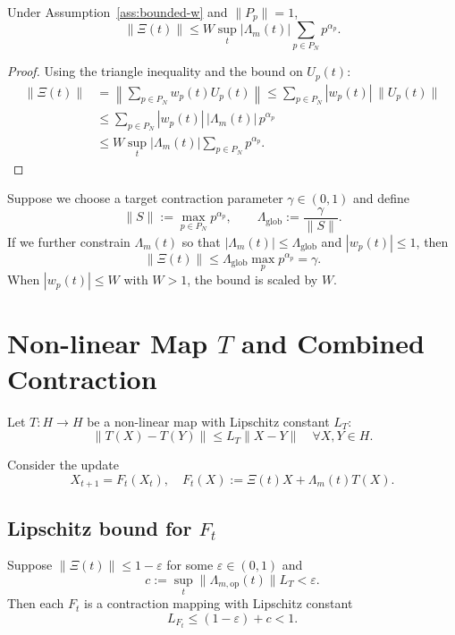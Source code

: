 \documentclass[11pt]{article}
\begin{document}
\begin{lemma}\label{lem:Xi-norm}
Under Assumption~\ref{ass:bounded-w} and $\|P_p\|=1$,
\[
\|\Xi(t)\| \le W \sup_t|\Lambda_m(t)| \sum_{p\in P_N} p^{\alpha_p}.
\]
\end{lemma}

\begin{proof}
Using the triangle inequality and the bound on $U_p(t)$:
\begin{align*}
\|\Xi(t)\|
&= \left\|\sum_{p\in P_N} w_p(t) U_p(t)\right\|
\le \sum_{p\in P_N} |w_p(t)|\,\|U_p(t)\| \\
&\le \sum_{p\in P_N} |w_p(t)|\,|\Lambda_m(t)|\,p^{\alpha_p} \\
&\le W \sup_t |\Lambda_m(t)| \sum_{p\in P_N} p^{\alpha_p}.
\end{align*}
\end{proof}

Suppose we choose a target contraction parameter $\gamma \in (0,1)$ and define
\[
\|S\| := \max_{p\in P_N} p^{\alpha_p},\qquad
\Lambda_{\mathrm{glob}} := \frac{\gamma}{\|S\|}.
\]
If we further constrain $\Lambda_m(t)$ so that $|\Lambda_m(t)| \le \Lambda_{\mathrm{glob}}$
and $|w_p(t)|\le 1$, then
\[
\|\Xi(t)\| \le \Lambda_{\mathrm{glob}} \max_{p} p^{\alpha_p} = \gamma.
\]
When $|w_p(t)| \le W$ with $W>1$, the bound is scaled by $W$.

\section{Non-linear Map $T$ and Combined Contraction}

Let $T: H \to H$ be a non-linear map with Lipschitz constant $L_T$:
\[
\|T(X) - T(Y)\| \le L_T \|X - Y\|\quad \forall X,Y\in H.
\]

Consider the update
\[
X_{t+1} = F_t(X_t),\quad
F_t(X) := \Xi(t) X + \Lambda_m(t) T(X).
\]

\subsection{Lipschitz bound for $F_t$}

\begin{lemma}
Suppose $\|\Xi(t)\|\le 1-\varepsilon$ for some $\varepsilon\in(0,1)$ and
\[
c := \sup_t \|\Lambda_{m,\mathrm{op}}(t)\| L_T < \varepsilon.
\]
Then each $F_t$ is a contraction mapping with Lipschitz constant
\[
L_{F_t} \le (1-\varepsilon) + c < 1.
\]
\end{lemma}
\end{document}
